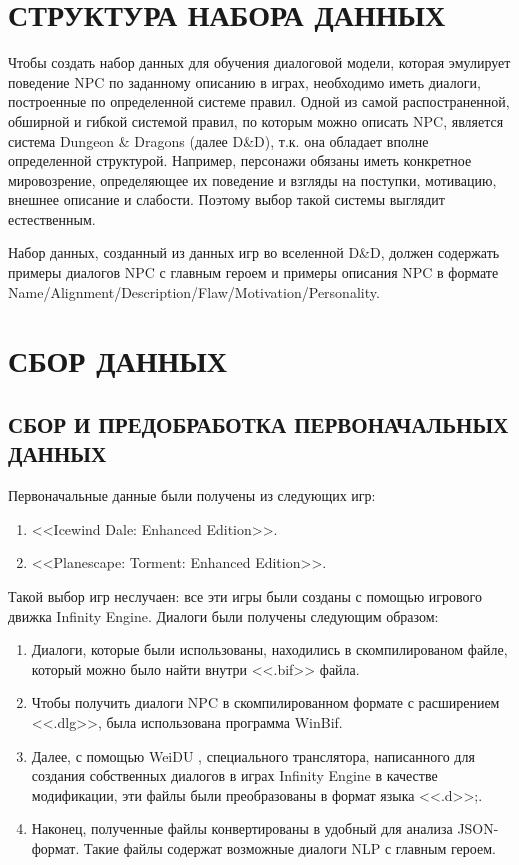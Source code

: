 \section{СТРУКТУРА НАБОРА ДАННЫХ}
Чтобы создать набор данных для обучения диалоговой модели, которая эмулирует поведение NPC по заданному описанию в играх, необходимо иметь диалоги, построенные по определенной системе правил. Одной из самой распостраненной, обширной и гибкой системой правил, по которым можно описать NPC, является система Dungeon \& Dragons (далее D\&D), т.к. она обладает вполне определенной структурой. Например, персонажи обязаны иметь конкретное мировозрение, определяющее их поведение и взгляды на поступки, мотивацию, внешнее описание и слабости. Поэтому выбор такой системы выглядит естественным. 

Набор данных, созданный из данных игр во вселенной D\&D, должен содержать примеры диалогов NPC с главным героем и примеры описания NPC в формате Name/Alignment/Description/Flaw/Motivation/Personality.

\section{СБОР ДАННЫХ}
\subsection{СБОР И ПРЕДОБРАБОТКА ПЕРВОНАЧАЛЬНЫХ ДАННЫХ}
Первоначальные данные были получены из следующих игр: 
\begin{enumerate}
      \item <<Icewind Dale: Enhanced Edition>>.
      \item <<Planescape: Torment: Enhanced Edition>>.
\end{enumerate}

Такой выбор игр неслучаен: все эти игры были созданы с помощью  игрового движка Infinity Engine. Диалоги были получены следующим образом:
\begin{enumerate}
      \item Диалоги, которые были использованы, находились в скомпилированом файле, который можно было найти внутри <<.bif>> файла.
      \item Чтобы получить диалоги NPC в скомпилированном формате с расширением <<.dlg>>, была использована программа WinBif.
      \item Далее, с помощью WeiDU \cite{weidu-repo}, специального транслятора,
            написанного для создания собственных диалогов в играх Infinity Engine в качестве модификации, эти файлы были преобразованы в формат языка <<.d>>;.
      \item Наконец, полученные файлы конвертированы в удобный для анализа JSON-формат. Такие файлы содержат возможные диалоги NLP с главным героем.
\end{enumerate}

